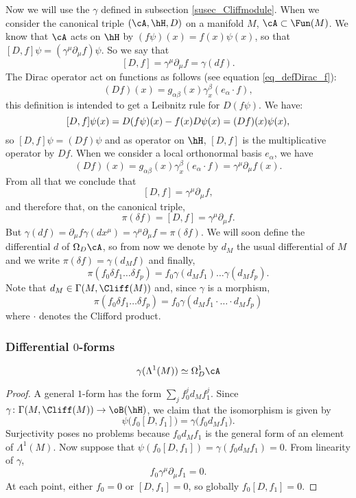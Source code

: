Now we will use the $\gamma$ defined in subsection \ref{susec_Cliffmodule}. When we consider the canonical triple $(\cA,\hH,D)$ on a manifold $M$, $\cA\subset\Fun(M)$. We know that $\cA$ acts on $\hH$ by $(f\psi)(x)=f(x)\psi(x)$, so that $[D,f]\psi=(\gamma^{\mu}\partial_{\mu}f)\psi$. So we say that 
\[ 
  [D,f]=\gamma^{\mu}\partial_{\mu}f=\gamma(df).
\]
The Dirac operator act on functions as follows (see equation \eqref{eq_defDirac_f}):
\[ 
  (Df)(x)=g_{\alpha\beta}(x)\gamma^{\beta}_x(e_{\alpha}\cdot f),
\]
this definition is intended to get a Leibnitz rule for $D(f\psi)$. We have:
\[ 
[D,f]\psi(x)=D(f\psi)(x)-f(x)D\psi(x)\\
		=(Df)(x)\psi(x),
\]
so $[D,f]\psi=(Df)\psi$ and as operator on $\hH$, $[D,f]$ is the multiplicative operator by $Df$. When we consider a local orthonormal basis $e_{\alpha}$, we have
\[ 
(Df)(x)=g_{\alpha\beta}(x)\gamma_x^{\beta}(e_{\alpha}\cdot f)
		=\gamma^{\mu}\partial_{\mu}f(x).
\]
From all that we conclude that 
\[
  [D,f]=\gamma^{\mu}\partial_{\mu}f,
\]
and therefore that, on the canonical triple, 
\begin{equation}
\pi(\delta f)=[D,f]=\gamma^{\mu}\partial_{\mu}f.
\end{equation}
But $\gamma(df)=\partial_{\mu}f\gamma(dx^{\mu})=\gamma^{\mu}\partial_{\mu}f=\pi(\delta f)$. We will soon define the differential $d$ of $\Omega_D\cA$, so from now we denote by $d_M$ the usual differential of $M$ and we write $\pi(\delta f)=\gamma(d_Mf)$ and finally,
\begin{equation}
\pi(f_0\delta f_1\ldots \delta f_p)=f_0\gamma(d_Mf_1)\ldots\gamma(d_Mf_p).
\end{equation}
Note that $d_M\in\Gamma(M,\Cliff(M))$ and, since $\gamma$ is a morphism, 
\begin{equation} \label{EqpildotsdeltagamdM}
  \pi(f_0\delta f_1\ldots\delta f_p)=f_0\gamma(d_Mf_1\cdot\ldots\cdot d_Mf_p)
\end{equation}
where $\cdot$ denotes the Clifford product. 


\subsubsection{Differential \texorpdfstring{$0$}{0}-forms}

\begin{lemma}
\[ 
\gamma(\Lambda^1(M))\simeq\Omega^1_D\cA
\]
\end{lemma}

\begin{proof}

A general $1$-form has the form $\sum_j f_0^jd_Mf_1^j$. Since $\gamma\colon \Gamma(M,\Cliff(M))\to \oB(\hH)$, we claim that the isomorphism is given by
\[ 
  \psi\big( f_0[D,f_1] \big)=\gamma\big( f_0d_Mf_1 \big).
\]
Surjectivity poses no problems because $f_0d_Mf_1$ is the general form of an element of $\Lambda^1(M)$. Now suppose that $\psi(f_0[D,f_1])=\gamma(f_0d_Mf_1)=0$. From linearity of $\gamma$,
\[ 
  f_0\gamma^{\mu}\partial_{\mu}f_1=0.
\]
At each point, either $f_0=0$ or $[D,f_1]=0$, so globally $f_0[D,f_1]=0$.
\end{proof}


